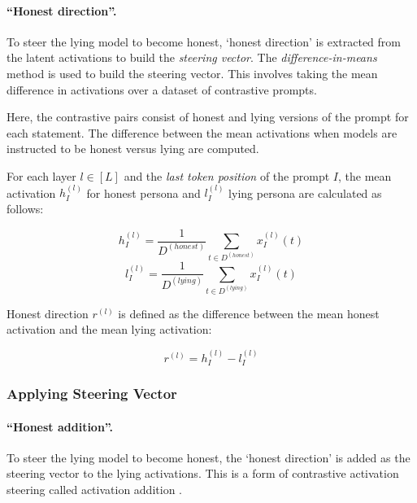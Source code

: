 \documentclass[]{paper}
\begin{document}
\paragraph{``Honest direction''.} To steer the lying model to become honest, ‘honest direction’ is extracted from the latent activations to build the \textit{steering vector}. The \textit{difference-in-means} method is used to build the steering vector. This involves taking the mean difference in activations over a dataset of contrastive prompts. 

Here, the contrastive pairs consist of honest and lying versions of the prompt for each statement.   The difference between the mean activations when models are instructed to be honest versus lying are computed.

For each layer \(l \in [L]\) and the \textit{last  token position} of the prompt \(I\), the mean activation \({h}_{I}^{(l)}\) for honest persona  and \(l_{I}^{(l)}\) lying persona are calculated as follows:

\begin{equation} \label{eq:mean_honest_lying}
{h}_{I}^{(l)} = \frac{1}{D^{(honest)}} \sum_{t \in D^{(honest)}} {x}_{I}^{(l)} (t) 
 \end{equation}  
\begin{equation}
{l}_{I}^{(l)} = \frac{1}{D^{(lying)}} \sum_{t \in D^{(lying)}} {x}_{I}^{(l)} (t)
\end{equation} 

Honest direction \(r^{(l)}\) is defined as the difference between the mean honest activation and the mean lying activation: 

\begin{equation} \label{eq:honest_direction}
r^{(l)} = {h}_{I}^{(l)} -
{l}_{I}^{(l)} 
\end{equation} 

\subsubsection{Applying Steering Vector}

\paragraph{``Honest addition''.}

To steer the lying model to become honest, the ‘honest direction’ is added as the steering vector to the lying activations. This is a form of contrastive activation steering called activation addition \cite{turnerActivationAdditionSteering2024}. 
\end{document}
